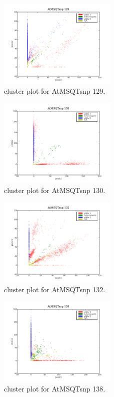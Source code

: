 \begin{figure}[H]
\includegraphics[width=0.5\textwidth]{figures/cluster_plot_AtMSQTsnp_129.png}
\caption{cluster plot for AtMSQTsnp 129.} \label{flAtMSQTsnp129}
\end{figure}
\begin{figure}[H]
\includegraphics[width=0.5\textwidth]{figures/cluster_plot_AtMSQTsnp_130.png}
\caption{cluster plot for AtMSQTsnp 130.} \label{flAtMSQTsnp130}
\end{figure}
\begin{figure}[H]
\includegraphics[width=0.5\textwidth]{figures/cluster_plot_AtMSQTsnp_132.png}
\caption{cluster plot for AtMSQTsnp 132.} \label{flAtMSQTsnp132}
\end{figure}
\begin{figure}[H]
\includegraphics[width=0.5\textwidth]{figures/cluster_plot_AtMSQTsnp_138.png}
\caption{cluster plot for AtMSQTsnp 138.} \label{flAtMSQTsnp138}
\end{figure}
